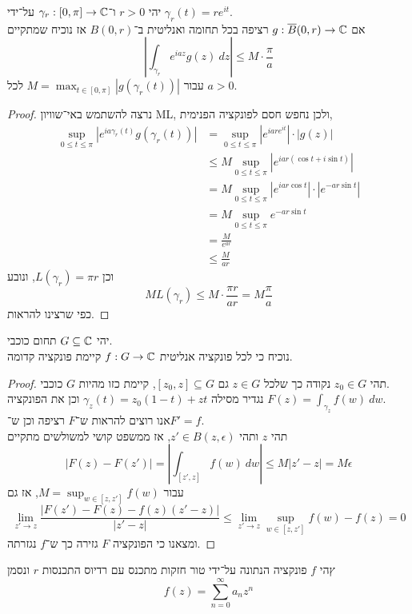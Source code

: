 \question{}
יהי $r > 0$ ו־$\gamma_r : [0, \pi] \to \mathbb{C}$ על־ידי $\gamma_r(t) = r e^{it}$. \\
אם $g : \overline{B}(0, r) \to \mathbb{C}$ רציפה בכל תחומה ואנליטית ב־$B(0, r)$ אז נוכיח שמתקיים
\[
	\left\lvert \int_{\gamma_r} e^{i a z} g(z)\ dz \right\rvert \le M \cdot \frac{\pi}{a}
\]
עבור $M = \max_{t \in [0, \pi]} |g(\gamma_r(t))|$ לכל $a > 0$.
\begin{proof}
	נרצה להשתמש באי־שוויון ML, ולכן נחפש חסם לפונקציה הפנימית,
	\begin{align*}
		\sup_{0 \le t \le \pi} |e^{i a \gamma_r(t)} g(\gamma_r(t))|
		& = \sup_{0 \le t \le \pi} |e^{i a r e^{it}}| \cdot |g(z)| \\
		& \le M \sup_{0 \le t \le \pi} |e^{i a r (\cos t + i \sin t)}| \\
		& = M \sup_{0 \le t \le \pi} |e^{i a r \cos t}| \cdot |e^{-ar \sin t}| \\
		& = M \sup_{0 \le t \le \pi} e^{-ar \sin t} \\
		& = \frac{M}{e^{ar}} \\
		& \le \frac{M}{a r}
	\end{align*}
	וכן $L(\gamma_r) = \pi r$, ונובע
	\[
		M L(\gamma_r) \le M \cdot \frac{\pi r}{a r} = M \frac{\pi}{a}
	\]
	כפי שרצינו להראות.
\end{proof}

\question{}
יהי $G \subseteq \mathbb{C}$ תחום כוכבי. \\
נוכיח כי לכל פונקציה אנליטית $f : G \to \mathbb{C}$ קיימת פונקציה קדומה.
\begin{proof}
	תהי $z_0 \in G$ נקודה כך שלכל $z \in G$ גם $[z_0, z] \subseteq G$, קיימת כזו מהיות $G$ כוכבי. \\
	נגדיר מסילה $\gamma_z(t) = z_0 (1 - t) + z t$ וכן את הפונקציה $F(z) = \int_{\gamma_z} f(w)\ dw$. \\
	אנו רוצים להראות ש־$F$ רציפה וכן ש־$F' = f$. \\
	תהי $z$ ותהי $z' \in B(z, \epsilon)$, אז ממשפט קושי למשולשים מתקיים
	\[
		|F(z) - F(z')| = \left\lvert \int_{[z', z]} f(w)\ dw \right\rvert \le M |z' - z| = M \epsilon
	\]
	עבור $M = \sup_{w \in [z, z']} f(w)$, אז גם
	\[
		\lim_{z' \to z} \frac{|F(z') - F(z) - f(z)(z' - z)|}{|z' - z|}
		\le \lim_{z' \to z} \sup_{w \in [z, z']} f(w) - f(z)
		= 0
	\]
	ומצאנו כי הפונקציה $F$ גזירה כך ש־$f$ נגזרתה.
\end{proof}

\question{}
ץהי $f$ פונקציה הנתונה על־ידי טור חזקות מתכנס עם רדיוס התכנסות $r$ ונסמן
\[
	f(z) = \sum_{n = 0}^{\infty} a_n z^n
\]


